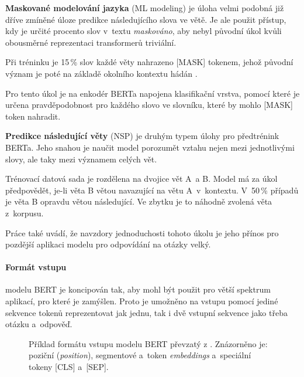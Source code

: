 \medskip
\textbf{Maskované modelování jazyka} (ML modeling) 
je úloha velmi podobná již dříve zmíněné úloze predikce následujícího slova ve větě. Je ale použit přístup, kdy je určité procento slov v~textu \emph{maskováno}, aby nebyl původní úkol kvůli obousměrné reprezentaci transformerů triviální.\par
Při tréninku je 15\,\% slov každé věty nahrazeno [MASK] tokenem, jehož původní význam je poté na základě okolního kontextu hádán \cite{BERT}.\par
Pro tento úkol je na enkodér BERTa napojena klasifikační vrstva, pomocí které je určena pravděpodobnost pro každého slovo ve slovníku, které by mohlo [MASK] token nahradit.\par
\smallskip
\textbf{Predikce následující věty} (NSP) je druhým typem úlohy pro předtrénink BERTa. Jeho snahou je naučit model porozumět vztahu nejen mezi jednotlivými slovy, ale taky mezi významem celých vět.\par
Trénovací datová sada je rozdělena na dvojice vět A~a B. Model má za úkol předpovědět, je-li věta B větou navazující na větu A~v~kontextu. V~50\,\% případů je věta B opravdu větou následující. Ve zbytku je to náhodně zvolená věta z~korpusu.\par
Práce \cite{BERT} také uvádí, že navzdory jednoduchosti tohoto úkolu je jeho přínos pro pozdější aplikaci modelu pro odpovídání na otázky velký.\par

\paragraph{Formát vstupu}
modelu BERT je koncipován tak, aby mohl být použit pro větší spektrum aplikací, pro které je zamýšlen. Proto je umožněno na vstupu pomocí jediné sekvence tokenů reprezentovat jak jednu, tak i dvě vstupní sekvence jako třeba otázku a~odpověď.

\begin{figure}[hbt]
	\centering
	\caption{Příklad formátu vstupu  modelu BERT převzatý z \cite{BERT}. Znázorněno je: poziční (\emph{position}), segmentové a~token \emph{embeddings} a~speciální tokeny [CLS] a~[SEP].}
	\label{bert_input}
\end{figure}

